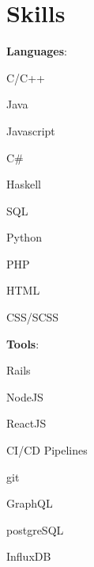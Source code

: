 \documentclass[10pt]{article} %
\begin{document}
	
	\vspace*{0.25\baselineskip}\section{Skills}%
	\setlength{\columnsep}{1pc}%
	\setlength{\multicolsep}{1pc}%
	\begin{minipage}[c]{\linewidth}
	\begin{multicols*}{3}%
		\setlength{\multicolsep}{0.5pc}%
		\setlength{\columnsep}{1pc}%
		\textbf{Languages}:
		\setlength\multicolsep{0pt}
		\begin{multicols}{2}
			\begin{loneinnerlist}
				\item C/C++
				\item Java
				\item Javascript
				\item C\#
				\item Haskell
				\item SQL
				\item Python
				\item PHP
				\item HTML
				\item CSS/SCSS
			\end{loneinnerlist}
		\end{multicols}
		\columnbreak
		\textbf{Tools}:
		\setlength\multicolsep{0pt}
		\begin{multicols}{2}
			\begin{loneinnerlist}
				\item Rails
				\item NodeJS
				\item ReactJS
				\item CI/CD Pipelines
				\item git
				\item GraphQL
				\item postgreSQL
				\item InfluxDB

\end{loneinnerlist}
\end{multicols}
\end{multicols*}
\end{minipage}
\end{document}
